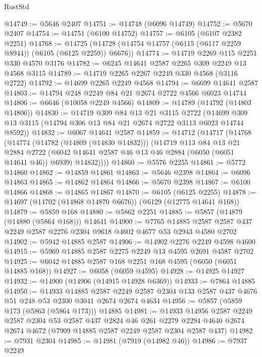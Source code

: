 \begin{lexlean}{RustStd}
\begin{coremodule}
@14749 := @5646 @2407
@14751 := @14748 (@6096 @14749)
@14752 := @5670 @2407
@14754 := @14751 (@6100 @14752)
@14757 := @6105 (@6107 @2382 @2251)
@14768 := @14725 (@14728 (@14754 @14757 (@6115 (@6117 @2259 @8944)) (@6105 (@6125 @2259)) @6676))
@14774 := @14719 @2269 @115 @2251 @330 @4570 @3176
@14782 := @6245 @14641 @2587 @2265 @309 @2249 @13 @4568 @3115
@14789 := @14719 @2265 @2267 @2249 @330 @4568 (@3116 @2722)
@14792 := @14699 @2265 @2249 @4568
@14794 := @6699 @14641 @2587
@14803 := @14794 @248 @2249 @84 @21 @2674 @2722 @4566 @6023 @14744
@14806 := @6646 (@10058 @2249 @4566)
@14809 := @14789 (@14792 (@14803 @14806))
@14830 := @14719
    @309
    @84
    @13
    @21
    @3115
    @2722
    (@14699 @309 @13 @3115 (@14794 @306 @13 @84 @21 @2674 @2722 @3113 @6023 @14744 @8592))
@14832 := @6067 @14641 @2587
@14859 := @14712
    (@14717
      (@14768
        (@14774
          (@14782 (@14809 (@14830 @14832)))
          (@14719
            @113
            @84
            @13
            @21
            @2884
            @2722
            (@6042 @14641 @2587 @46 @13 @46 @2884 (@6050 (@6051 @14641 @46)) @6939)
            @14832))))
@14860 := @5576 @2255
@14861 := @5772 @14860
@14862 := @14859 @14861
@14863 := @5646 @2398
@14864 := @6096 @14863
@14865 := @14862 @14864
@14866 := @5670 @2398
@14867 := @6100 @14866
@14868 := @14865 @14867
@14870 := @6105 (@6125 @2255)
@14878 := @14697 (@14702 (@14868 @14870 @6676)) (@6129 (@12775 @14641 @168))
@14879 := @5859 @168
@14880 := @5862 @2251
@14885 := @5857 (@14879 (@14880 (@5864 @168))) @14641
@14900 := @7765
    @14885
    @2587
    @2587
    @437
    @2249
    @2587
    @2276
    @2304
    @9618
    @4602
    @4677
    @53
    @2943
    @4580
    @2702
@14902 := @5942 @14885 @2587
@14906 := @14902 @2276 @2249 @4598 @4600
@14915 := @5969 @14885 @2587 @2275 @2249 @13 @4595 @2691 @4587 @2702
@14925 := @6042 @14885 @2587 @168 @2251 @168 @4595 (@6050 (@6051 @14885 @168))
@14927 := @6058 (@6059 @4595)
@14928 := @14925 @14927
@14932 := @14900 (@14906 (@14915 @14928 @6369))
@14933 := @7864 @14885
@14950 := @14933
    @14885
    @2587
    @2249
    @2587
    @2304
    @133
    @2587
    @437
    @4676
    @51
    @248
    @53
    @2300
    @3041
    @2674
    @2674
    @4634
@14956 := @5857 (@5859 @173 (@5863 (@5864 @173))) @14885
@14981 := @14933
    @14956
    @2587
    @2249
    @2587
    @2304
    @53
    @2587
    @437
    @2824
    @46
    @261
    @2279
    @2294
    @4640
    @2674
    @2674
    @4672
    (@7909 @14885 @2587 @2249 @2587 @2304 @2587 @437)
@14982 := @7931 @2304
@14985 := @14981 (@7919 (@14982 @46))
@14986 := @7937 @2249

\end{coremodule}
\end{lexlean}
